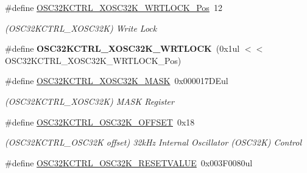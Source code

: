 \begin{DoxyCompactItemize}
\item 
\hypertarget{group___s_a_m_l21___o_s_c32_k_c_t_r_l_gaac0d0821539272a535011934da425e8b}{}\#define \hyperlink{group___s_a_m_l21___o_s_c32_k_c_t_r_l_gaac0d0821539272a535011934da425e8b}{O\+S\+C32\+K\+C\+T\+R\+L\+\_\+\+X\+O\+S\+C32\+K\+\_\+\+W\+R\+T\+L\+O\+C\+K\+\_\+\+Pos}~12\label{group___s_a_m_l21___o_s_c32_k_c_t_r_l_gaac0d0821539272a535011934da425e8b}

\begin{DoxyCompactList}\small\item\em (O\+S\+C32\+K\+C\+T\+R\+L\+\_\+\+X\+O\+S\+C32\+K) Write Lock \end{DoxyCompactList}\item 
\hypertarget{group___s_a_m_l21___o_s_c32_k_c_t_r_l_ga5e3d4392d4bac19edc5ea0a1362f2414}{}\#define {\bfseries O\+S\+C32\+K\+C\+T\+R\+L\+\_\+\+X\+O\+S\+C32\+K\+\_\+\+W\+R\+T\+L\+O\+C\+K}~(0x1ul $<$$<$ O\+S\+C32\+K\+C\+T\+R\+L\+\_\+\+X\+O\+S\+C32\+K\+\_\+\+W\+R\+T\+L\+O\+C\+K\+\_\+\+Pos)\label{group___s_a_m_l21___o_s_c32_k_c_t_r_l_ga5e3d4392d4bac19edc5ea0a1362f2414}

\item 
\hypertarget{group___s_a_m_l21___o_s_c32_k_c_t_r_l_gad0a22f67c5bcc3d0f0df3840c623f7ec}{}\#define \hyperlink{group___s_a_m_l21___o_s_c32_k_c_t_r_l_gad0a22f67c5bcc3d0f0df3840c623f7ec}{O\+S\+C32\+K\+C\+T\+R\+L\+\_\+\+X\+O\+S\+C32\+K\+\_\+\+M\+A\+S\+K}~0x000017\+D\+Eul\label{group___s_a_m_l21___o_s_c32_k_c_t_r_l_gad0a22f67c5bcc3d0f0df3840c623f7ec}

\begin{DoxyCompactList}\small\item\em (O\+S\+C32\+K\+C\+T\+R\+L\+\_\+\+X\+O\+S\+C32\+K) M\+A\+S\+K Register \end{DoxyCompactList}\item 
\hypertarget{group___s_a_m_l21___o_s_c32_k_c_t_r_l_ga41f2758d674a9c8f07298c8e01f6d409}{}\#define \hyperlink{group___s_a_m_l21___o_s_c32_k_c_t_r_l_ga41f2758d674a9c8f07298c8e01f6d409}{O\+S\+C32\+K\+C\+T\+R\+L\+\_\+\+O\+S\+C32\+K\+\_\+\+O\+F\+F\+S\+E\+T}~0x18\label{group___s_a_m_l21___o_s_c32_k_c_t_r_l_ga41f2758d674a9c8f07298c8e01f6d409}

\begin{DoxyCompactList}\small\item\em (O\+S\+C32\+K\+C\+T\+R\+L\+\_\+\+O\+S\+C32\+K offset) 32k\+Hz Internal Oscillator (O\+S\+C32\+K) Control \end{DoxyCompactList}\item 
\hypertarget{group___s_a_m_l21___o_s_c32_k_c_t_r_l_ga7818b41ddcd0d63737314df5f315c5ed}{}\#define \hyperlink{group___s_a_m_l21___o_s_c32_k_c_t_r_l_ga7818b41ddcd0d63737314df5f315c5ed}{O\+S\+C32\+K\+C\+T\+R\+L\+\_\+\+O\+S\+C32\+K\+\_\+\+R\+E\+S\+E\+T\+V\+A\+L\+U\+E}~0x003\+F0080ul\label{group___s_a_m_l21___o_s_c32_k_c_t_r_l_ga7818b41ddcd0d63737314df5f315c5ed}


\end{DoxyCompactItemize}
